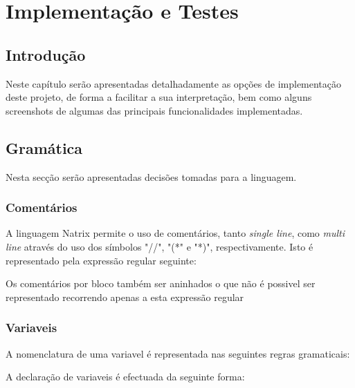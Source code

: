 \section{Implementação e Testes}
\label{sec2:implementation}

\subsection{Introdução}
\label{sec2:subsec:intro}

Neste capítulo serão apresentadas detalhadamente as opções de implementação deste projeto, de forma a facilitar a sua interpretação, bem como alguns screenshots de algumas das principais funcionalidades implementadas.

\subsection{Gramática}
\label{sec2:subsec:choices}

Nesta secção serão apresentadas decisões tomadas para a linguagem.

\subsubsection{Comentários}

A linguagem Natrix permite o uso de comentários, tanto \textit{single line}, como \textit{multi line} através do uso dos símbolos "//", "(*" e "*)", respectivamente. Isto é representado pela expressão regular seguinte:



Os comentários por bloco também ser aninhados o que não é possivel ser representado recorrendo apenas a esta expressão regular

\subsubsection{Variaveis}
\label{sec2:subsubsec:variaveis}

A nomenclatura de uma variavel é representada nas seguintes regras gramaticais:



A declaração de variaveis é efectuada da seguinte forma:



